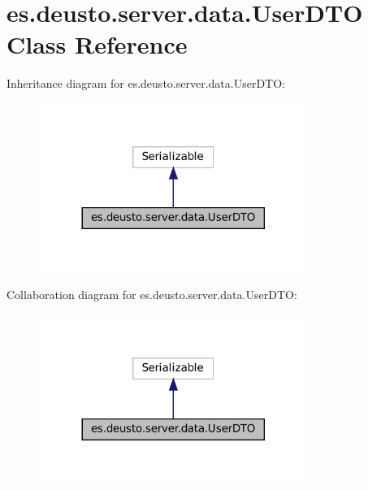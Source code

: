 \hypertarget{classes_1_1deusto_1_1server_1_1data_1_1_user_d_t_o}{}\section{es.\+deusto.\+server.\+data.\+User\+D\+TO Class Reference}
\label{classes_1_1deusto_1_1server_1_1data_1_1_user_d_t_o}


Inheritance diagram for es.\+deusto.\+server.\+data.\+User\+D\+TO\+:\nopagebreak
\begin{figure}[H]
\begin{center}
\leavevmode
\includegraphics[width=248pt]{classes_1_1deusto_1_1server_1_1data_1_1_user_d_t_o__inherit__graph}
\end{center}
\end{figure}


Collaboration diagram for es.\+deusto.\+server.\+data.\+User\+D\+TO\+:\nopagebreak
\begin{figure}[H]
\begin{center}
\leavevmode
\includegraphics[width=248pt]{classes_1_1deusto_1_1server_1_1data_1_1_user_d_t_o__coll__graph}
\end{center}
\end{figure}

